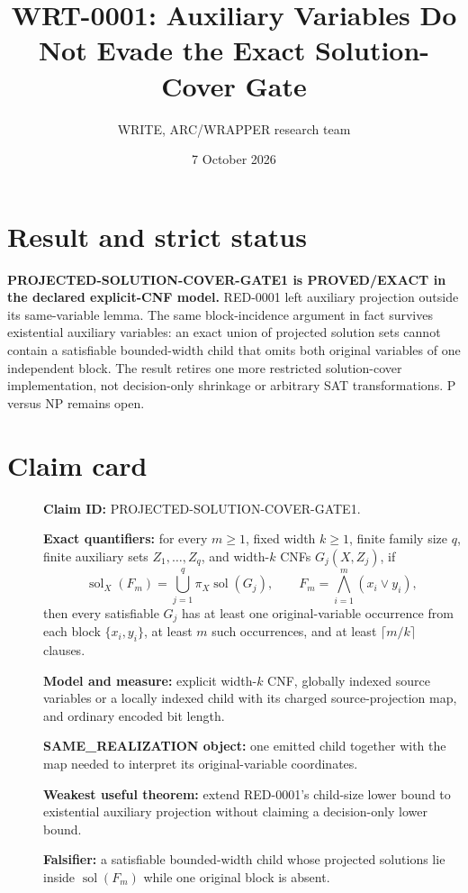 \documentclass[11pt]{article}
\title{WRT-0001: Auxiliary Variables Do Not Evade the Exact Solution-Cover Gate}
\author{WRITE, ARC/WRAPPER research team}
\date{7 October 2026}
\newcommand{\sol}{\operatorname{sol}}
\newcommand{\proj}{\pi}
\begin{document}
\maketitle

\section{Result and strict status}
\textbf{PROJECTED-SOLUTION-COVER-GATE1 is PROVED/EXACT in the declared
explicit-CNF model.}  RED-0001 left auxiliary projection outside its
same-variable lemma.  The same block-incidence argument in fact survives
existential auxiliary variables: an exact union of projected solution sets
cannot contain a satisfiable bounded-width child that omits both original
variables of one independent block.  The result retires one more restricted
solution-cover implementation, not decision-only shrinkage or arbitrary SAT
transformations.  P versus NP remains open.

\section{Claim card}
\begin{description}
\item[] \textbf{Claim ID:} PROJECTED-SOLUTION-COVER-GATE1.
\item[] \textbf{Exact quantifiers:} for every $m\geq1$, fixed width $k\geq1$,
finite family size $q$, finite auxiliary sets $Z_1,\ldots,Z_q$, and width-$k$
CNFs $G_j(X,Z_j)$, if
\[
 \sol_X(F_m)=\bigcup_{j=1}^{q}\proj_X\sol(G_j),\qquad
 F_m=\bigwedge_{i=1}^{m}(x_i\vee y_i),
\]
then every satisfiable $G_j$ has at least one original-variable occurrence
from each block $\{x_i,y_i\}$, at least $m$ such occurrences, and at least
$\lceil m/k\rceil$ clauses.
\item[] \textbf{Model and measure:} explicit width-$k$ CNF, globally indexed
source variables or a locally indexed child with its charged source-projection
map, and ordinary encoded bit length.
\item[] \textbf{SAME\_REALIZATION object:} one emitted child together with the
map needed to interpret its original-variable coordinates.
\item[] \textbf{Weakest useful theorem:} extend RED-0001's child-size lower
bound to existential auxiliary projection without claiming a decision-only
lower bound.
\item[] \textbf{Falsifier:} a satisfiable bounded-width child whose projected
solutions lie inside $\sol(F_m)$ while one original block is absent.
\end{description}
\end{document}
